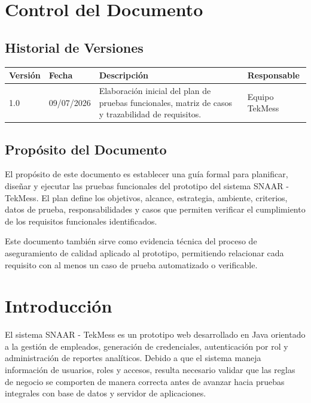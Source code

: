 \documentclass[12pt,a4paper]{article}
\begin{document}
\newpage

\section{Control del Documento}

\subsection{Historial de Versiones}

\begin{longtable}{|p{2cm}|p{3cm}|p{5.5cm}|p{3.5cm}|}
\hline
\rowcolor{grisClaro}
\textbf{Versión} & \textbf{Fecha} & \textbf{Descripción} & \textbf{Responsable} \\
\hline
1.0 & 09/07/2026 & Elaboración inicial del plan de pruebas funcionales, matriz de casos y trazabilidad de requisitos. & Equipo TekMess \\
\hline
\end{longtable}

\subsection{Propósito del Documento}

El propósito de este documento es establecer una guía formal para planificar, diseñar y ejecutar las pruebas funcionales del prototipo del sistema SNAAR - TekMess. El plan define los objetivos, alcance, estrategia, ambiente, criterios, datos de prueba, responsabilidades y casos que permiten verificar el cumplimiento de los requisitos funcionales identificados.

Este documento también sirve como evidencia técnica del proceso de aseguramiento de calidad aplicado al prototipo, permitiendo relacionar cada requisito con al menos un caso de prueba automatizado o verificable.

\section{Introducción}

El sistema SNAAR - TekMess es un prototipo web desarrollado en Java orientado a la gestión de empleados, generación de credenciales, autenticación por rol y administración de reportes analíticos. Debido a que el sistema maneja información de usuarios, roles y accesos, resulta necesario validar que las reglas de negocio se comporten de manera correcta antes de avanzar hacia pruebas integrales con base de datos y servidor de aplicaciones.
\end{document}
